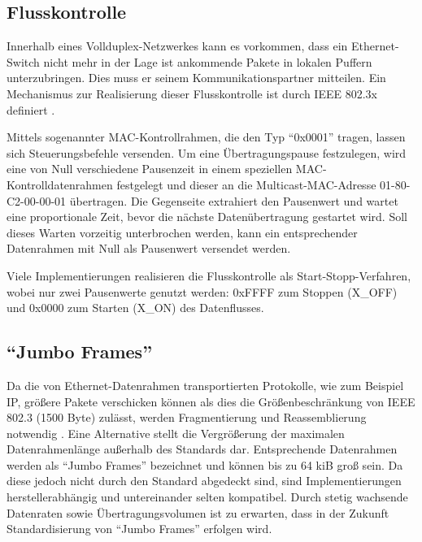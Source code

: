 \subsection{Flusskontrolle}
\label{sec:grundlagen_ethernet_flowcontrol}
Innerhalb eines Vollduplex-Netzwerkes kann es vorkommen, dass ein
E\-ther\-net\--Switch nicht mehr in der Lage ist ankommende Pakete in
lokalen Puffern unterzubringen. Dies muss er seinem
Kommunikationspartner mitteilen. Ein Mechanismus zur Realisierung
dieser Flusskontrolle ist durch IEEE 802.3x definiert
\cite[S. 741ff. (Annex 31B)]{ieee802_3}.

Mittels sogenannter MAC-Kontrollrahmen, die den Typ ``0x0001'' tragen,
lassen sich Steuerungsbefehle versenden. Um eine Übertragungspause
festzulegen, wird eine von Null verschiedene Pausenzeit in einem
speziellen MAC-Kontrolldatenrahmen festgelegt und dieser an die
Multicast-MAC-Adresse 01-80-C2-00-00-01 übertragen. Die Gegenseite
extrahiert den Pausenwert und wartet eine proportionale Zeit, bevor
die nächste Datenübertragung gestartet wird. Soll dieses Warten
vorzeitig unterbrochen werden, kann ein entsprechender Datenrahmen mit
Null als Pausenwert versendet werden.

Viele Implementierungen realisieren die Flusskontrolle als
Start-Stopp-Verfahren, wobei nur zwei Pausenwerte genutzt werden: 0xFFFF zum
Stoppen (X\_OFF) und 0x0000 zum Starten (X\_ON) des Datenflusses.

\subsection{"`Jumbo Frames"'}
\label{sec:grundlagen_ethernet_jumboframes}

Da die von Ethernet-Datenrahmen transportierten Protokolle, wie zum
Beispiel IP, größere Pakete verschicken können als dies die
Größenbeschränkung von IEEE 802.3 (1500 Byte) zulässt, werden
Fragmentierung und Reassemblierung notwendig \cite[S. 375 ff.]{spurgeon2000}. Eine Alternative stellt
die Vergrößerung der maximalen Datenrahmenlänge außerhalb des
Standards dar. Entsprechende Datenrahmen werden als ``Jumbo Frames''
bezeichnet und können bis zu 64 kiB groß sein. Da diese jedoch nicht
durch den Standard abgedeckt sind, sind Implementierungen
herstellerabhängig und untereinander selten kompatibel. Durch stetig
wachsende Datenraten sowie Übertragungsvolumen ist zu erwarten, dass
in der Zukunft Standardisierung von ``Jumbo Frames'' erfolgen wird.
	